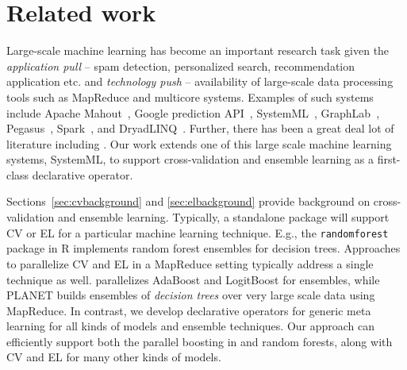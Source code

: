 \documentclass{vldb}
\begin{document}
\section{Related work}
\label{sec:related}

Large-scale machine learning has become an important research task given the \emph{application pull} --
spam detection, personalized search, recommendation
application etc. and {\em technology push} -- availability of large-scale data processing
tools such as MapReduce and multicore systems.
Examples of such systems include Apache Mahout~\cite{mahout}, Google prediction API~\cite{gapi},
SystemML~\cite{systemml}, GraphLab~\cite{Low+al:uai10graphlab}, Pegasus~\cite{DBLP:conf/icdm/KangTF09},
Spark~\cite{spark}, and DryadLINQ~\cite{dryadLINQ}. Further, there has been a great deal
lot of literature including \cite{DBLP:conf/nips/ChuKLYBNO06,DBLP:journals/pvldb/CohenDDHW09}.
Our work extends one of this large scale machine learning systems, SystemML,
to support cross-validation and ensemble learning as a first-class declarative operator.

Sections~\ref{sec:cvbackground} and \ref{sec:elbackground} provide background on cross-validation and ensemble learning. Typically, a standalone package will support CV or EL for a particular machine learning technique. E.g., the {\tt randomforest} package in R implements random forest ensembles for decision trees. Approaches to parallelize CV and EL in a MapReduce setting typically address a single technique as well. \cite{parallel-boosting} parallelizes AdaBoost and LogitBoost for ensembles, while PLANET \cite{planet} builds ensembles of {\em decision trees} over very large scale data using MapReduce.
In contrast, we develop declarative operators for generic meta learning for all kinds of models and ensemble techniques. Our approach can efficiently support both the parallel boosting in \cite{parallel-boosting} and random forests, along with CV and EL for many other kinds of models.
\end{document}
